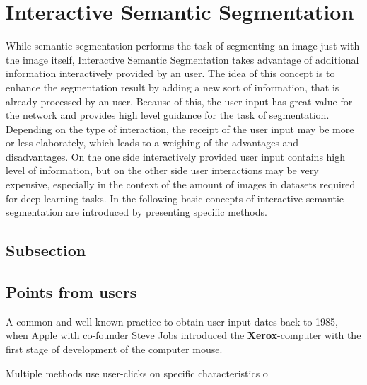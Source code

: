 
\section{Interactive Semantic Segmentation}\label{ord:ch2:sec3}

While semantic segmentation performs the task of segmenting an image just with the image itself, Interactive Semantic Segmentation takes advantage of additional information interactively provided by an user.
The idea of this concept is to enhance the segmentation result by adding a new sort of information, that is already processed by an user.
Because of this, the user input has great value for the network and provides high level guidance for the task of segmentation.
Depending on the type of interaction, the receipt of the user input may be more or less elaborately, which leads to a weighing of the advantages and disadvantages.
On the one side interactively provided user input contains high level of information, but on the other side user interactions may be very expensive, especially in the context of the amount of images in datasets required for deep learning tasks.
In the following basic concepts of interactive semantic segmentation are introduced by presenting specific methods.
 

\subsection{Subsection}\label{ord:ch2:sec3:subsec1}

\subsection{Points from users}\label{ord:ch2:sec3:subsec2}

A common and well known practice to obtain user input dates back to 1985, when Apple with co-founder Steve Jobs introduced the \textbf{Xerox}-computer with the first stage of development of the computer mouse.

Multiple methods use user-clicks on specific characteristics o
